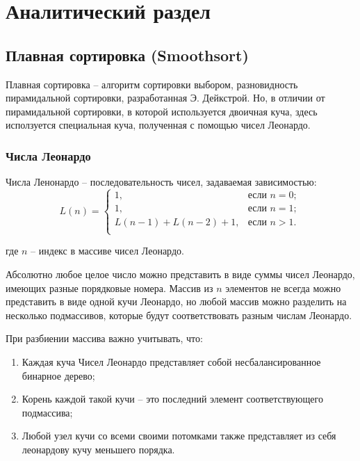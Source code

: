 \chapter{Аналитический раздел}
\label{cha:analytical}
    \section{Плавная сортировка (Smoothsort)}
\par Плавная сортировка -- алгоритм сортировки выбором, разновидность пирамидальной сортировки, разработанная Э. Дейкстрой. Но, в отличии от пирамидальной сортировки, в которой используется двоичная куча, здесь исползуется специальная куча, полученная с помощью чисел Леонардо.
	\subsection*{Числа Леонардо}
\par Числа Ленонардо -- последовательность чисел, задаваемая зависимостью:
	\begin{equation}\label{formula:LeoNumbers}
	L(n) = \begin{cases}
		1, &\text{если } n = 0;\\
		1, &\text{если } n = 1;\\
		L(n-1) + L(n-2) + 1, &\text{если } n > 1.\\
	\end{cases}
\end{equation} \par где \begin{math}n\end{math} -- индекс в массиве чисел Леонардо.
	\par Абсолютно любое целое число можно представить в виде суммы чисел Леонардо, имеющих разные порядковые номера. Массив из \begin{math}n\end{math} элементов не всегда можно представить в виде одной кучи Леонардо, но любой массив можно разделить на несколько подмассивов, которые будут соответствовать разным числам Леонардо.
	\par При разбиении массива важно учитывать, что:
	\begin{enumerate}
		\item Каждая куча Чисел Леонардо представляет собой несбалансированное бинарное дерево;
		\item Корень каждой такой кучи -- это последний элемент соответствующего подмассива;
		\item Любой узел кучи со всеми своими потомками также представляет из себя леонардову кучу меньшего порядка. 
	\end{enumerate}
